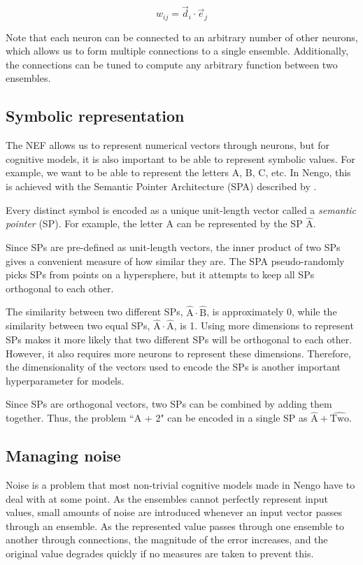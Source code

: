 \documentclass[10pt, a4paper, twocolumn]{article}
\begin{document}
$$w_{ij} = \vec{d}_i \cdot \vec{e}_j$$

Note that each neuron can be connected to an arbitrary number of other neurons, which allows us to form multiple connections to a single ensemble. Additionally, the connections can be tuned to compute any arbitrary function between two ensembles.

\subsection{Symbolic representation}

The NEF allows us to represent numerical vectors through neurons, but for cognitive models, it is also important to be able to represent symbolic values. For example, we want to be able to represent the letters A, B, C, etc. In Nengo, this is achieved with the Semantic Pointer Architecture (SPA) described by \cite{Eliasmith2015}.

Every distinct symbol is encoded as a unique unit-length vector called a \emph{semantic pointer} (SP). For example, the letter A can be represented by the SP $\hat{\text{A}}$.

Since SPs are pre-defined as unit-length vectors, the inner product of two SPs gives a convenient measure of how similar they are. The SPA pseudo-randomly picks SPs from points on a hypersphere, but it attempts to keep all SPs orthogonal to each other. 

The similarity between two different SPs, $\hat{\text{A}} \cdot \hat{\text{B}}$, is approximately 0, while the similarity between two equal SPs, $\hat{\text{A}} \cdot \hat{\text{A}}$, is 1. Using more dimensions to represent SPs makes it more likely that two different SPs will be orthogonal to each other. However, it also requires more neurons to represent these dimensions. Therefore, the dimensionality of the vectors used to encode the SPs is another important hyperparameter for models.

Since SPs are orthogonal vectors, two SPs can be combined by adding them together. Thus, the problem ``A + 2" can be encoded in a single SP as $\hat{\text{A}} + \hat{\text{Two}}$.

\subsection{Managing noise}

Noise is a problem that most non-trivial cognitive models made in Nengo have to deal with at some point. As the ensembles cannot perfectly represent input values, small amounts of noise are introduced whenever an input vector passes through an ensemble. As the represented value passes through one ensemble to another through connections, the magnitude of the error increases, and the original value degrades quickly if no measures are taken to prevent this.
\end{document}
